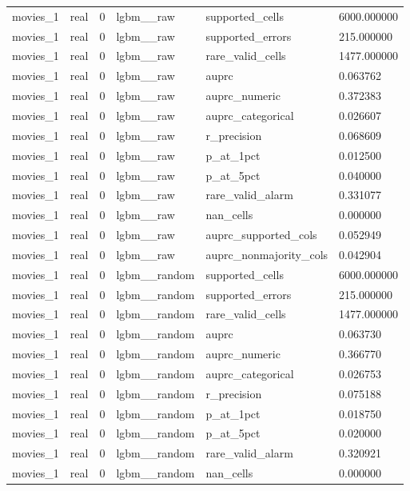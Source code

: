 \begin{tabular}{llllll}
movies\_1 & real & 0 & lgbm\_\_raw & supported\_cells & 6000.000000 \\
movies\_1 & real & 0 & lgbm\_\_raw & supported\_errors & 215.000000 \\
movies\_1 & real & 0 & lgbm\_\_raw & rare\_valid\_cells & 1477.000000 \\
movies\_1 & real & 0 & lgbm\_\_raw & auprc & 0.063762 \\
movies\_1 & real & 0 & lgbm\_\_raw & auprc\_numeric & 0.372383 \\
movies\_1 & real & 0 & lgbm\_\_raw & auprc\_categorical & 0.026607 \\
movies\_1 & real & 0 & lgbm\_\_raw & r\_precision & 0.068609 \\
movies\_1 & real & 0 & lgbm\_\_raw & p\_at\_1pct & 0.012500 \\
movies\_1 & real & 0 & lgbm\_\_raw & p\_at\_5pct & 0.040000 \\
movies\_1 & real & 0 & lgbm\_\_raw & rare\_valid\_alarm & 0.331077 \\
movies\_1 & real & 0 & lgbm\_\_raw & nan\_cells & 0.000000 \\
movies\_1 & real & 0 & lgbm\_\_raw & auprc\_supported\_cols & 0.052949 \\
movies\_1 & real & 0 & lgbm\_\_raw & auprc\_nonmajority\_cols & 0.042904 \\
movies\_1 & real & 0 & lgbm\_\_random & supported\_cells & 6000.000000 \\
movies\_1 & real & 0 & lgbm\_\_random & supported\_errors & 215.000000 \\
movies\_1 & real & 0 & lgbm\_\_random & rare\_valid\_cells & 1477.000000 \\
movies\_1 & real & 0 & lgbm\_\_random & auprc & 0.063730 \\
movies\_1 & real & 0 & lgbm\_\_random & auprc\_numeric & 0.366770 \\
movies\_1 & real & 0 & lgbm\_\_random & auprc\_categorical & 0.026753 \\
movies\_1 & real & 0 & lgbm\_\_random & r\_precision & 0.075188 \\
movies\_1 & real & 0 & lgbm\_\_random & p\_at\_1pct & 0.018750 \\
movies\_1 & real & 0 & lgbm\_\_random & p\_at\_5pct & 0.020000 \\
movies\_1 & real & 0 & lgbm\_\_random & rare\_valid\_alarm & 0.320921 \\
movies\_1 & real & 0 & lgbm\_\_random & nan\_cells & 0.000000 \\

\end{tabular}
